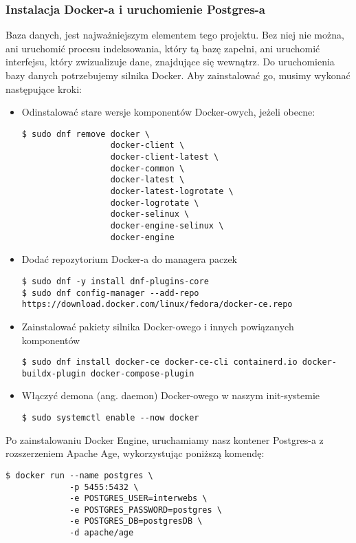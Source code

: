 \documentclass[a4paper, 12pt]{article}
\begin{document}
\subsubsection{Instalacja Docker-a i uruchomienie Postgres-a}
Baza danych, jest najważniejszym elementem tego projektu. Bez niej nie można, ani uruchomić procesu indeksowania, który tą bazę zapełni, ani uruchomić interfejsu, który zwizualizuje dane, znajdujące się wewnątrz. Do uruchomienia bazy danych potrzebujemy silnika Docker.
Aby zainstalować go, musimy wykonać następujące kroki:
\begin{itemize}
 \item Odinstalować stare wersje komponentów Docker-owych, jeżeli obecne:
 \begin{lstlisting}
$ sudo dnf remove docker \
                  docker-client \
                  docker-client-latest \
                  docker-common \
                  docker-latest \
                  docker-latest-logrotate \
                  docker-logrotate \
                  docker-selinux \
                  docker-engine-selinux \
                  docker-engine
 \end{lstlisting}
 \item Dodać repozytorium Docker-a do managera paczek
 \begin{lstlisting}
$ sudo dnf -y install dnf-plugins-core
$ sudo dnf config-manager --add-repo https://download.docker.com/linux/fedora/docker-ce.repo
 \end{lstlisting}
 \item Zainstalować pakiety silnika Docker-owego i innych powiązanych komponentów
 \begin{lstlisting}
$ sudo dnf install docker-ce docker-ce-cli containerd.io docker-buildx-plugin docker-compose-plugin
 \end{lstlisting}
 \item Włączyć demona (ang. daemon) Docker-owego w naszym init-systemie
 \begin{lstlisting}
$ sudo systemctl enable --now docker
 \end{lstlisting}
\end{itemize}\cite{fedDockerEngine}

Po zainstalowaniu Docker Engine, uruchamiamy nasz kontener Postgres-a z rozszerzeniem Apache Age, wykorzystując poniższą komendę:

\begin{lstlisting}
$ docker run --name postgres \
             -p 5455:5432 \
             -e POSTGRES_USER=interwebs \
             -e POSTGRES_PASSWORD=postgres \
             -e POSTGRES_DB=postgresDB \
             -d apache/age
\end{lstlisting}
\end{document}
